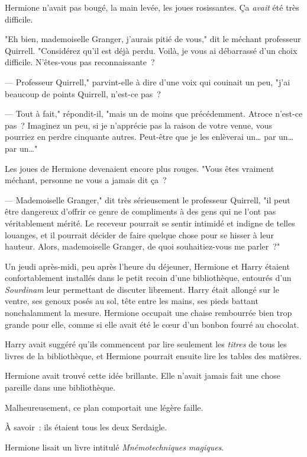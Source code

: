Hermione n'avait pas bougé, la main levée, les joues rosissantes. Ça \emph{avait} été très difficile.

"Eh bien, mademoiselle Granger, j'aurais pitié de vous," dit le méchant professeur Quirrell. "Considérez qu'il est déjà perdu. Voilà, je vous ai débarrassé d'un choix difficile. N'êtes-vous pas reconnaissante~?

--- Professeur Quirrell," parvint-elle à dire d'une voix qui couinait un peu, "j'ai beaucoup de points Quirrell, n'est-ce pas~?

--- Tout à fait," répondit-il, "mais un de moins que précédemment. Atroce n'est-ce pas~? Imaginez un peu, si je n'apprécie pas la raison de votre venue, vous pourriez en perdre cinquante autres. Peut-être que je les enlèverai un… par un… par un…"

Les joues de Hermione devenaient encore plus rouges. "Vous êtes vraiment méchant, personne ne vous a jamais dit ça~?

--- Mademoiselle Granger," dit très sérieusement le professeur Quirrell, "il peut être dangereux d'offrir ce genre de compliments à des gens qui ne l'ont pas véritablement mérité. Le receveur pourrait se sentir intimidé et indigne de telles louanges, et il pourrait décider de faire quelque chose pour se hisser à leur hauteur. Alors, mademoiselle Granger, de quoi souhaitiez-vous me parler~?"

\later

Un jeudi après-midi, peu après l'heure du déjeuner, Hermione et Harry étaient confortablement installés dans le petit recoin d'une bibliothèque, entourés d'un \emph{Sourdinam} leur permettant de discuter librement. Harry était allongé sur le ventre, ses genoux posés au sol, tête entre les mains, ses pieds battant nonchalamment la mesure. Hermione occupait une chaise rembourrée bien trop grande pour elle, comme si elle avait été le cœur d'un bonbon fourré au chocolat.

Harry avait suggéré qu'ils commencent par lire seulement les \emph{titres} de tous les livres de la bibliothèque, et Hermione pourrait ensuite lire les tables des matières.

Hermione avait trouvé cette idée brillante. Elle n'avait jamais fait une chose pareille dans une bibliothèque.

Malheureusement, ce plan comportait une légère faille.

À savoir~: ils étaient tous les deux Serdaigle.

Hermione lisait un livre intitulé \emph{Mnémotechniques magiques}.

